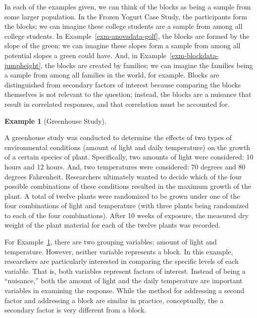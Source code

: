\documentclass[
  letterpaper,
  DIV=11,
  numbers=noendperiod]{scrreprt}
\theoremstyle{plain}
\theoremstyle{definition}
\newtheorem{example}{Example}[chapter]
\theoremstyle{definition}
\theoremstyle{remark}
\begin{document}
In each of the examples given, we can think of the blocks as being a
sample from some larger population. In the Frozen Yogurt Case Study, the
participants form the blocks; we can imagine these college students are
a sample from among all college students. In
Example~\ref{exm-anovadata-golf}, the blocks are formed by the slope of
the green; we can imagine these slopes form a sample from among all
potential slopes a green could have. And, in
Example~\ref{exm-blockdata-jumpheight}, the blocks are created by
families; we can imagine the families being a sample from among all
families in the world, for example. Blocks are distinguished from
secondary factors of interest because comparing the blocks themselves is
not relevant to the question; instead, the blocks are a nuisance that
result in correlated responses, and that correlation must be accounted
for.

\begin{example}[Greenhouse
Study]\protect\hypertarget{exm-blockdata-greenhouse}{}\label{exm-blockdata-greenhouse}

A greenhouse study was conducted to determine the effects of two types
of environmental conditions (amount of light and daily temperature) on
the growth of a certain species of plant. Specifically, two amounts of
light were considered: 10 hours and 12 hours. And, two temperatures were
considered: 70 degrees and 80 degrees Fahrenheit. Researchers ultimately
wanted to decide which of the four possible combinations of these
conditions resulted in the maximum growth of the plant. A total of
twelve plants were randomized to be grown under one of the four
combinations of light and temperature (with three plants being
randomized to each of the four combinations). After 10 weeks of
exposure, the measured dry weight of the plant material for each of the
twelve plants was recorded.

\end{example}

For Example~\ref{exm-blockdata-greenhouse}, there are two grouping
variables: amount of light and temperature. However, neither variable
represents a block. In this example, researchers are particularly
interested in comparing the specific levels of each variable. That is,
both variables represent factors of interest. Instead of being a
``nuisance,'' both the amount of light and the daily temperature are
important variables in examining the response. While the method for
addressing a second factor and addressing a block are similar in
practice, conceptually, the a secondary factor is very different from a
block.
\end{document}
